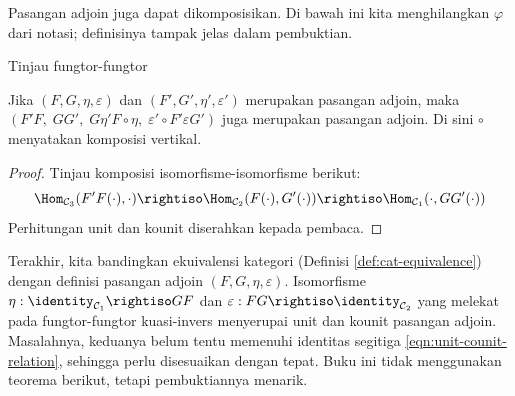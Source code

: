 Pasangan adjoin juga dapat dikomposisikan. Di bawah ini kita menghilangkan $\varphi$ dari notasi; definisinya tampak jelas dalam pembuktian.

\begin{proposition}\label{prop:adjunction-composition}
	Tinjau fungtor-fungtor
	Jika $(F, G, \eta, \varepsilon)$ dan $(F', G', \eta', \varepsilon')$ merupakan pasangan adjoin, maka $(F'F, \; GG', \; G \eta' F \circ \eta, \; \varepsilon' \circ F' \varepsilon G')$ juga merupakan pasangan adjoin. Di sini $\circ$ menyatakan komposisi vertikal.
\end{proposition}
\begin{proof}
	Tinjau komposisi isomorfisme-isomorfisme berikut:
	\[ \Hom_{\mathcal{C}_3}(F'F(\cdot), \cdot) \rightiso \Hom_{\mathcal{C}_2}(F(\cdot), G'(\cdot)) \rightiso \Hom_{\mathcal{C}_1}(\cdot, GG'(\cdot)) \]
	Perhitungan unit dan kounit diserahkan kepada pembaca.
\end{proof}

Terakhir, kita bandingkan ekuivalensi kategori (Definisi \ref{def:cat-equivalence}) dengan definisi pasangan adjoin $(F, G, \eta, \varepsilon)$. Isomorfisme $\eta: \identity_{\mathcal{C}_1} \rightiso GF$ dan $\varepsilon: FG \rightiso \identity_{\mathcal{C}_2}$ yang melekat pada fungtor-fungtor kuasi-invers menyerupai unit dan kounit pasangan adjoin. Masalahnya, keduanya belum tentu memenuhi identitas segitiga \eqref{eqn:unit-counit-relation}, sehingga perlu disesuaikan dengan tepat. Buku ini tidak menggunakan teorema berikut, tetapi pembuktiannya menarik.

